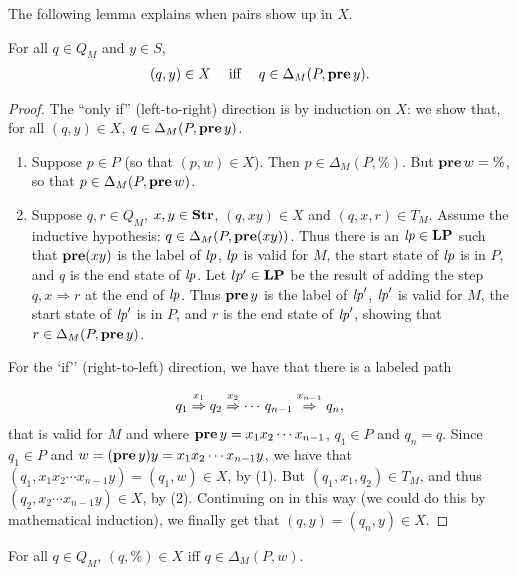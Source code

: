 The following lemma explains when pairs show up in $X$.

\begin{lemma}
\label{AcceptLem1}
For all $q\in Q_M$ and $y\in S$,
\begin{gather*}
(q,y)\in X\quad\;\allowbreak\mbox{iff}\allowbreak\;\quad q\in\Delta_M(P,\mathbf{pre}\,y) .
\end{gather*}
\end{lemma}

\begin{proof}
The ``only if'' (left-to-right) direction is by induction on $X$:
we show that, for all $(q,y)\in X$, $q\in\Delta_M(P,\mathbf{pre}\,y)$.
\begin{enumerate}[(1)]
\item Suppose $p\in P$ (so that $(p,w)\in X$).  Then
  $p\in\Delta_M(P,\%)$.  But $\mathbf{pre}\,w=\%$, so that
  $p\in\Delta_M(P,\mathbf{pre}\,w)$.

\item Suppose $q,r\in Q_M$, $x,y\in\mathbf{Str}$, $(q,xy)\in X$ and
  $(q,x,r)\in T_M$.  Assume the inductive hypothesis:
  $q\in\Delta_M(P,\mathbf{pre}(xy))$.  Thus there is an ${\it lp}\in\mathbf{LP}$ such that
  $\mathbf{pre}(xy)$ is the label of ${\it lp}$, ${\it lp}$ is valid for $M$, the start
  state of ${\it lp}$ is in $P$, and $q$ is the end state of ${\it lp}$.  Let
  $lp'\in\mathbf{LP}$ be the result of adding the step $q,x\Rightarrow r$ at
  the end of ${\it lp}$.  Thus $\mathbf{pre}\,y$ is the label of ${\it lp}'$, ${\it lp}'$ is
  valid for $M$, the start state of ${\it lp}'$ is in $P$, and $r$ is the
  end state of ${\it lp}'$, showing that $r\in\Delta_M(P,\mathbf{pre}\,y)$.
\end{enumerate}

For the `if'' (right-to-left) direction, we have that there is a
labeled path
\begin{gather*}
q_1\stackrel{\strut x_1}{\Rightarrow}q_2\stackrel{\strut x_2}{\Rightarrow}\cdots\,q_{n-1}\stackrel{\strut x_{n-1}}{\Rightarrow}q_n ,
\end{gather*}
that is valid for $M$ and where $\mathbf{pre}\,y=x_1x_2\cdots x_{n-1}$,
$q_1\in P$ and $q_n=q$.  Since $q_1\in P$ and
$w=(\mathbf{pre}\,y)y=x_1x_2\cdots x_{n-1}y$, we have that
$(q_1, x_1x_2\cdots x_{n-1}y)=(q_1,w)\in X$, by (1).  But
$(q_1,x_1,q_2)\in T_M$, and thus $(q_2, x_2\cdots x_{n-1}y)\in X$,
by (2). Continuing on in this way (we could do this by mathematical
induction), we finally get that $(q,y)=(q_n,y)\in X$.
\end{proof}

\begin{lemma}
\label{AcceptLem2}
For all $q\in Q_M$, $(q,\%)\in X$ iff $q\in\Delta_M(P,w)$.
\end{lemma}

